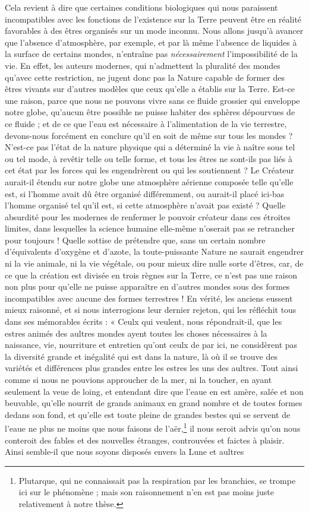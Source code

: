 \documentclass[a4paper, 11pt, oneside, landscape]{article}
\begin{document}
Cela revient à dire que certaines conditions biologiques qui nous paraissent incompatibles avec les fonctions de l'existence sur la Terre peuvent être en réalité favorables à des êtres organisés sur un mode inconnu. Nous allons jusqu'à avancer que l'absence d'atmosphère, par exemple, et par là même l'absence de liquides à la surface de certains mondes, n'entraîne pas \emph{nécessairement} l'impossibilité de la vie. En effet, les auteurs modernes, qui n'admettent la pluralité des mondes qu'avec cette restriction, ne jugent donc pas la Nature capable de former des êtres vivants sur d'autres modèles que ceux qu'elle a établis sur la Terre. Est-ce une raison, parce que nous ne pouvons vivre sans ce fluide grossier qui enveloppe notre globe, qu'aucun être possible ne puisse habiter des sphères dépourvues de ce fluide ; et de ce que l'eau est nécessaire à l'alimentation de la vie terrestre, devons-nous forcément en conclure qu'il en soit de même sur tous les mondes ? N'est-ce pas l'état de la nature physique qui a déterminé la vie à naître sous tel ou tel mode, à revêtir telle ou telle forme, et tous les êtres ne sont-ils pas liés à cet état par les forces qui les engendrèrent ou qui les soutiennent ? Le Créateur aurait-il étendu sur notre globe une atmosphère aérienne composée telle qu'elle est, si l'homme avait dû être organisé différemment, ou aurait-il placé ici-bas l'homme organisé tel qu'il est, si cette atmosphère n'avait pas existé ? Quelle absurdité pour les modernes de renfermer le pouvoir créateur dans ces étroites limites, dans lesquelles la science humaine elle-même n'oserait pas se retrancher pour toujours ! Quelle sottise de prétendre que, sans un certain nombre d'équivalents d'oxygène et d'azote, la toute-puissante Nature ne saurait engendrer ni la vie animale, ni la vie végétale, ou pour mieux dire nulle sorte d'êtres, car, de ce que la création est divisée en trois règnes sur la Terre, ce n'est pas une raison non plus pour qu'elle ne puisse apparaître en d'autres mondes sous des formes incompatibles avec aucune des formes terrestres ! En vérité, les anciens eussent mieux raisonné, et si nous interrogions leur dernier rejeton, qui les réfléchit tous dans ses mémorables écrits : « Ceulx qui veulent, nous répondrait-il, que les estres animés des aultres mondes ayent toutes les choses nécessaires à la naissance, vie, nourriture et entretien qu'ont ceulx de par ici, ne considèrent pas la diversité grande et inégalité qui est dans la nature, là où il se trouve des variétés et différences plus grandes entre les estres les uns des aultres. Tout ainsi comme si nous ne pouvions approucher de la mer, ni la toucher, en ayant seulement la veue de loing, et entendant dire que l'eaue en est amère, salée et non beuvable, qu'elle nourrit de grands animaux en grand nombre et de toutes formes dedans son fond, et qu'elle est toute pleine de grandes bestes qui se servent de l'eaue ne plus ne moins que nous faisons de l'aër,\footnote{Plutarque, qui ne connaissait pas la respiration par les branchies, se trompe ici sur le phénomène ; mais son raisonnement n'en est pas moins juste relativement à notre thèse.} il nous seroit advis qu'on nous conteroit des fables et des nouvelles étranges, controuvées et faictes à plaisir. Ainsi semble-il que nous soyons disposés envers la Lune et aultres 
\end{document}
